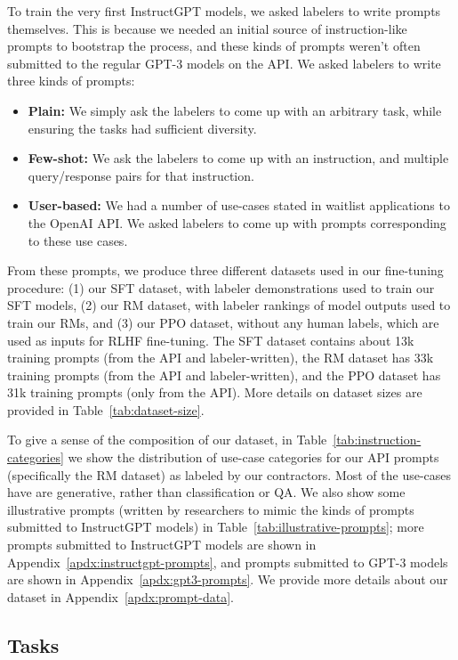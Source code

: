 To train the very first InstructGPT models, we asked labelers to write prompts themselves. This is because we needed an initial source of instruction-like prompts to bootstrap the process, and these kinds of prompts weren't often submitted to the regular GPT-3 models on the API. We asked labelers to write three kinds of prompts:
\begin{itemize}
    \item \textbf{Plain:}  We simply ask the labelers to come up with an arbitrary task, while ensuring the tasks had sufficient diversity.
\item \textbf{Few-shot:}  We ask the labelers to come up with an instruction, and multiple query/response pairs for that instruction.  
\item \textbf{User-based:}  We had a number of use-cases stated in waitlist applications to the OpenAI API.  We asked labelers to come up with prompts corresponding to these use cases. 
\end{itemize}



From these prompts, we produce three different datasets used in our fine-tuning procedure: (1) our SFT dataset, with labeler demonstrations used to train our SFT models, (2) our RM dataset, with labeler rankings of model outputs used to train our RMs, and (3) our PPO dataset, without any human labels, which are used as inputs for RLHF fine-tuning. The SFT dataset contains about 13k training prompts (from the API and labeler-written), the RM dataset has 33k training prompts (from the API and labeler-written), and the PPO dataset has 31k training prompts (only from the API). More details on dataset sizes are provided in Table~\ref{tab:dataset-size}. 

To give a sense of the composition of our dataset, in Table~\ref{tab:instruction-categories} we show the distribution of use-case categories for our API prompts (specifically the RM dataset) as labeled by our contractors. Most of the use-cases have are generative, rather than classification or QA. We also show some illustrative prompts (written by researchers to mimic the kinds of prompts submitted to InstructGPT models) in Table~\ref{tab:illustrative-prompts}; more prompts submitted to InstructGPT models are shown in Appendix~\ref{apdx:instructgpt-prompts}, and prompts submitted to GPT-3 models are shown in Appendix~\ref{apdx:gpt3-prompts}.
We provide more details about our dataset in Appendix~\ref{apdx:prompt-data}.


\subsection{Tasks}
\label{sec:task}

